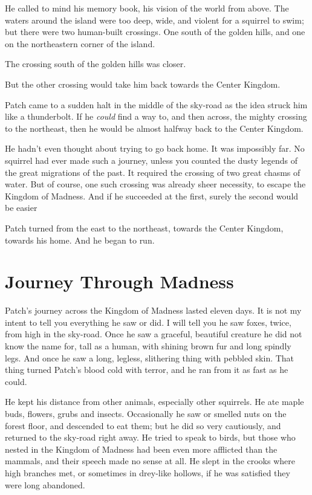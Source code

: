 \documentclass[12pt]{book}
\begin{document}
He called to mind his memory book, his vision of the world from above. The waters around the island were too deep, wide, and violent for a squirrel to swim; but there were two human-built crossings. One south of the golden hills, and one on the northeastern corner of the island.

The crossing south of the golden hills was closer.

But the other crossing would take him back towards the Center Kingdom.

Patch came to a sudden halt in the middle of the sky-road as the idea struck him like a thunderbolt. If he {\it could} find a way to, and then across, the mighty crossing to the northeast, then he would be almost halfway back to the Center Kingdom.

He hadn't even thought about trying to go back home. It was impossibly far. No squirrel had ever made such a journey, unless you counted the dusty legends of the great migrations of the past. It required the crossing of two great chasms of water. But of course, one such crossing was already sheer necessity, to escape the Kingdom of Madness. And if he succeeded at the first, surely the second would be easier %

Patch turned from the east to the northeast, towards the Center Kingdom, towards his home. And he began to run.


\section{Journey Through Madness}

Patch's journey across the Kingdom of Madness lasted eleven days. It is not my intent to tell you everything he saw or did. I will tell you he saw foxes, twice, from high in the sky-road. Once he saw a graceful, beautiful creature he did not know the name for, tall as a human, with shining brown fur and long spindly legs. And once he saw a long, legless, slithering thing with pebbled skin. That thing turned Patch's blood cold with terror, and he ran from it as fast as he could.

He kept his distance from other animals, especially other squirrels. He ate maple buds, flowers, grubs and insects. Occasionally he saw or smelled nuts on the forest floor, and descended to eat them; but he did so very cautiously, and returned to the sky-road right away. He tried to speak to birds, but those who nested in the Kingdom of Madness had been even more afflicted than the mammals, and their speech made no sense at all. He slept in the crooks where high branches met, or sometimes in drey-like hollows, if he was satisfied they were long abandoned.
\end{document}
